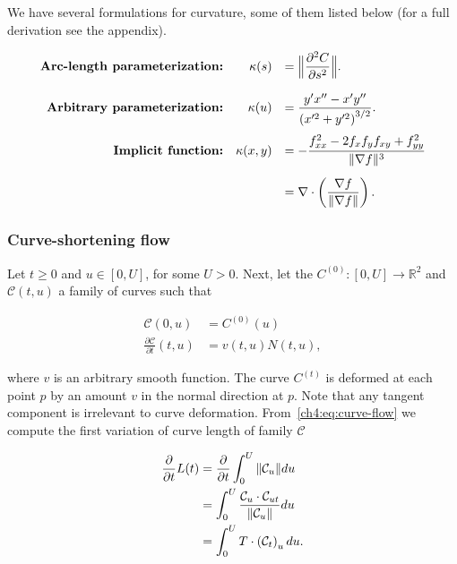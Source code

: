 We have several formulations for curvature, some of them listed below (for a full derivation see the appendix). 

\begin{align*}
\begin{array}{rrl}
	\textbf{Arc-length parameterization:} & \displaystyle \kappa(s) &= \displaystyle \Big\lVert \frac{\partial^2 C}{\partial s^2} \Big\rVert. \\[1.5em]	
	\textbf{Arbitrary parameterization:} & \displaystyle \kappa(u) &= \displaystyle \frac{y'x'' - x'y''}{\left( x'^2 + y'^2 \right)^{3/2}}. \\[1.5em]
	\textbf{Implicit function:} & \displaystyle \kappa(x,y) &= \displaystyle -\frac{f_{xx}^2 - 2f_xf_yf_{xy} + f_{yy}^2}{\lVert\nabla f\rVert^3} \\[1.5em]
	&&= \displaystyle \nabla \cdot \left( \frac{\nabla f}{\lVert\nabla f\rVert} \right).
\end{array}
\end{align*}


\subsubsection{Curve-shortening flow}
\label{ch4:sec:curve-shortening-flow}

Let $ t\geq 0$ and $u \in [0,U]$, for some $U>0$. Next, let the $C^{(0)}:[0,U] \rightarrow \mathbb{R}^2$ and $\mathcal{C}(t,u)$ a family of curves such that

\begin{align}
	\mathcal{C}(0,u) & = C^{(0)}(u) \\
	\frac{\partial \mathcal{C}}{\partial t}(t,u) &= v(t,u) N(t,u),
	\label{ch4:eq:curve-normal-flow}
\end{align}

where $v$ is an arbitrary smooth function. The curve ${C}^{(t)}$ is deformed at each point $p$ by an amount $v$ in the normal direction at $p$. Note that any tangent component is irrelevant to curve deformation. From~\cref{ch4:eq:curve-flow} we compute the first variation of curve length of family $\mathcal{C}$

\begin{align*}
	\frac{\partial }{\partial t}L(t) &= \frac{\partial}{\partial t}\int_{0}^{U}{\lVert \mathcal{C}_u \rVert du} \\
	&= \int_{0}^{U}{ \frac{ \mathcal{C}_u \cdot \mathcal{C}_{ut} }{\lVert\mathcal{C}_u\rVert } du} \\
	&= \int_{0}^{U}{ T \cdot \left( \mathcal{C}_{t} \right)_u  du}.
\end{align*}

